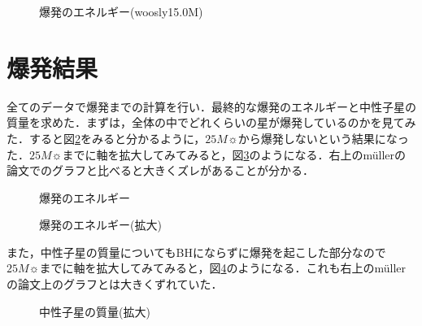 \begin{figure}[htbp]
  \begin{center}
  \end{center}
  \caption{爆発のエネルギー(woosly15.0M)}
  \label{fig:example_E_t}
\end{figure}

\newpage

\section{爆発結果}

全てのデータで爆発までの計算を行い．最終的な爆発のエネルギーと中性子星の質量を求めた．まずは，全体の中でどれくらいの星が爆発しているのかを見てみた．すると図\ref{fig:result_3}をみると分かるように，$25M\sun$から爆発しないという結果になった．$25M\sun$までに軸を拡大してみてみると，図\ref{fig:result_1}のようになる．右上のm\"{u}llerの論文でのグラフと比べると大きくズレがあることが分かる．


\begin{figure}[htbp]
  \begin{center}
  \end{center}
  \caption{爆発のエネルギー}
  \label{fig:result_3}
\end{figure}

\begin{figure}[htbp]
  \begin{center}
  \end{center}
  \caption{爆発のエネルギー(拡大)}
  \label{fig:result_1}
\end{figure}

\newpage
また，中性子星の質量についてもBHにならずに爆発を起こした部分なので$25M\sun$までに軸を拡大してみてみると，図\ref{fig:result_2}のようになる．これも右上のm\"{u}llerの論文上のグラフとは大きくずれていた．

\begin{figure}[htbp]
  \begin{center}
  \end{center}
  \caption{中性子星の質量(拡大)}
  \label{fig:result_2}
\end{figure}
